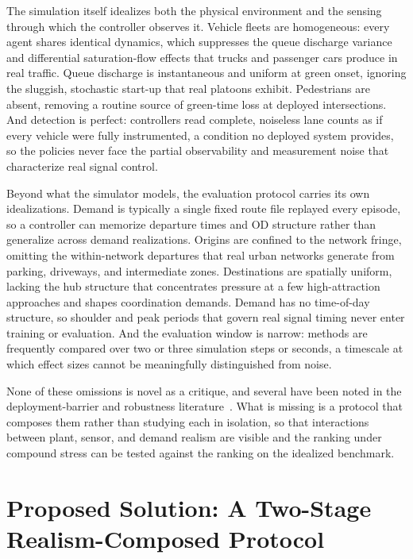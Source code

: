 \documentclass[conference]{IEEEtran}
\begin{document}
The simulation itself idealizes both the physical environment and the sensing through which the controller observes it. Vehicle fleets are homogeneous: every agent shares identical dynamics, which suppresses the queue discharge variance and differential saturation-flow effects that trucks and passenger cars produce in real traffic. Queue discharge is instantaneous and uniform at green onset, ignoring the sluggish, stochastic start-up that real platoons exhibit. Pedestrians are absent, removing a routine source of green-time loss at deployed intersections. And detection is perfect: controllers read complete, noiseless lane counts as if every vehicle were fully instrumented, a condition no deployed system provides, so the policies never face the partial observability and measurement noise that characterize real signal control.

Beyond what the simulator models, the evaluation protocol carries its own idealizations. Demand is typically a single fixed route file replayed every episode, so a controller can memorize departure times and OD structure rather than generalize across demand realizations. Origins are confined to the network fringe, omitting the within-network departures that real urban networks generate from parking, driveways, and intermediate zones. Destinations are spatially uniform, lacking the hub structure that concentrates pressure at a few high-attraction approaches and shapes coordination demands. Demand has no time-of-day structure, so shoulder and peak periods that govern real signal timing never enter training or evaluation. And the evaluation window is narrow: methods are frequently compared over two or three simulation steps or seconds, a timescale at which effect sizes cannot be meaningfully distinguished from noise.

None of these omissions is novel as a critique, and several have been noted in the deployment-barrier and robustness literature~\cite{chen2022realdeal, tan2020robust, rodrigues2019towards}. What is missing is a protocol that composes them rather than studying each in isolation, so that interactions between plant, sensor, and demand realism are visible and the ranking under compound stress can be tested against the ranking on the idealized benchmark.

\section{Proposed Solution: A Two-Stage Realism-Composed Protocol}
\end{document}

